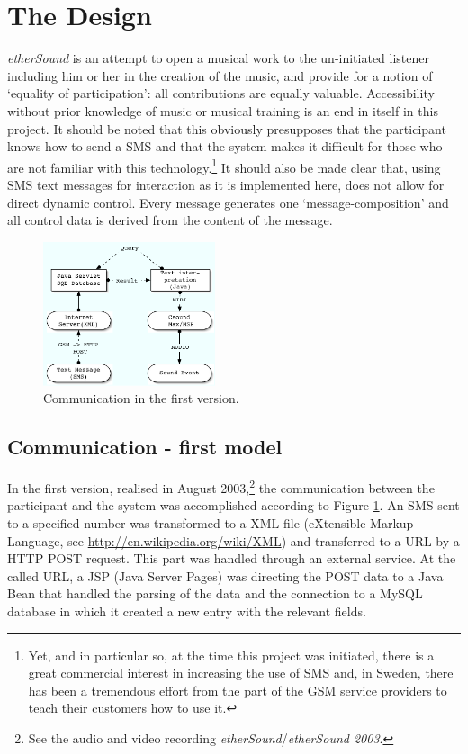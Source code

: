 \section{The Design} 
\emph{etherSound} is an attempt to open a musical work to the un-initiated listener including him or her in the creation of the music, and provide for a notion of `equality of participation': all contributions are equally valuable. Accessibility without prior knowledge of music or musical training is an end in itself in this project. It should be noted that this obviously presupposes that the participant knows how to send a SMS and that the system makes it difficult for those who are not familiar with this technology.\footnote{Yet, and in particular so, at the time this project was   initiated, there is a great commercial interest in   increasing the use of SMS and, in Sweden, there has been a   tremendous effort from the part of the GSM service providers to   teach their customers how to use it.} It should also be made clear that, using SMS text messages for interaction as it is implemented here, does not allow for direct dynamic control. Every message generates one `message-composition' and all control data is derived from the content of the message.

\begin{figure}[hbp]
\begin{center}
\includegraphics[width=0.45\textwidth]{img/ethsnd/Figure1}
\caption{Communication in the first version.} \label{model1}
\end{center}
\end{figure}

\subsection{Communication - first model}
\label{sec:comm-first}
In the first version, realised in August 2003,\footnote{See the audio   and video recording \emph{etherSound}/\emph{etherSound 2003}.} the communication between the participant and the system was accomplished according to Figure \ref{model1}. An SMS sent to a specified number was transformed to a XML file (eXtensible Markup Language, see \url{http://en.wikipedia.org/wiki/XML}) and transferred to a URL by a HTTP POST request. This part was handled through an external service. At the called URL, a JSP (Java Server Pages) was directing the POST data to a Java Bean \citep{j2ee} that handled the parsing of the data and the connection to a MySQL database in which it created a new entry with the relevant fields. 

